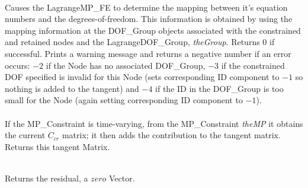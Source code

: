  \\
Causes the LagrangeMP\_FE to determine the mapping between it's equation
numbers and the degrees-of-freedom. This information is obtained by
using the mapping information at the DOF\_Group objects associated with
the constrained and retained nodes and the LagrangeDOF\_Group, {\em
theGroup}. Returns $0$ if
successful. Prints a warning message and returns a negative number if
an error occurs: $-2$ if the
Node has no associated DOF\_Group, $-3$ if the constrained DOF
specified is invalid for this Node (sets corresponding ID component to
$-1$ so nothing is added to the tangent) and $-4$ if the ID in the
DOF\_Group is too small for the Node (again setting corresponding ID
component to $-1$). \\ 

 \\
If the MP\_Constraint is time-varying, from the MP\_Constraint
{\em theMP} it obtains the current $C_{cr}$ matrix; it then adds the
contribution to the tangent matrix. Returns this tangent Matrix.

 \\
Returns the residual, a $zero$ Vector. \\


